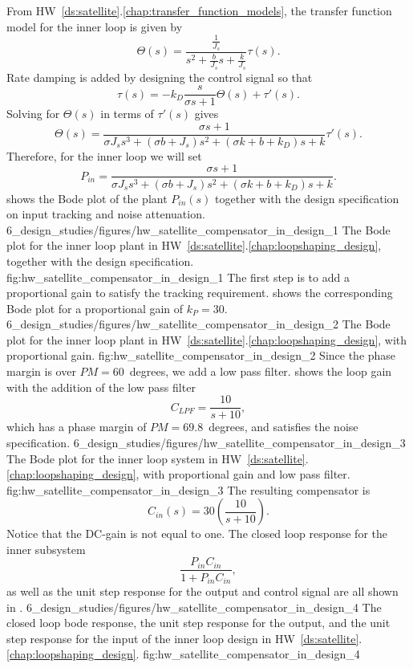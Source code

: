 From HW~\ref{ds:satellite}.\ref{chap:transfer_function_models}, the transfer function model for the inner loop is given by
\[
\Theta(s)  = \frac{\frac{1}{J_s}}{s^2+\frac{b}{J_s}s+\frac{k}{J_s}}\tau(s).
\]
Rate damping is added by designing the control signal so that
\[
\tau(s) = -k_D\frac{s}{\sigma s+1}\Theta(s) + \tau'(s).
\]
Solving for $\Theta(s)$ in terms of $\tau'(s)$ gives
\[
\Theta(s)  = \frac{\sigma s + 1}{\sigma J_s s^3 + (\sigma b + J_s)s^2+(\sigma k + b + k_D)s + k}\tau'(s).
\]
Therefore, for the inner loop we will set
\[
P_{in} = \frac{\sigma s + 1}{\sigma J_s s^3 + (\sigma b + J_s)s^2+(\sigma k + b + k_D)s + k}.
\]
 shows the Bode plot of the plant $P_{in}(s)$ together with the design specification on input tracking and noise attenuation.
%
	{6_design_studies/figures/hw_satellite_compensator_in_design_1}
   	{The Bode plot for the inner loop plant in HW~\ref{ds:satellite}.\ref{chap:loopshaping_design}, together with the design specification.}
   	{fig:hw_satellite_compensator_in_design_1}
The first step is to add a proportional gain to satisfy the tracking requirement.
 shows the corresponding Bode plot for a proportional gain of $k_P=30$.
	{6_design_studies/figures/hw_satellite_compensator_in_design_2}
   	{The Bode plot for the inner loop plant in HW~\ref{ds:satellite}.\ref{chap:loopshaping_design}, with proportional gain.}
   	{fig:hw_satellite_compensator_in_design_2}
Since the phase margin is over $PM=60$~degrees, we add a low pass filter.  
 shows the loop gain with the addition of the low pass filter
\[
C_{LPF} = \frac{10}{s+10},
\]
which has a phase margin of $PM=69.8$~degrees, and satisfies the noise specification.
	{6_design_studies/figures/hw_satellite_compensator_in_design_3}
   	{The Bode plot for the inner loop system in HW~\ref{ds:satellite}.\ref{chap:loopshaping_design}, with proportional gain and low pass filter.}
   	{fig:hw_satellite_compensator_in_design_3}
The resulting compensator is
\[
C_{in}(s) = 30\left(\frac{10}{s+10}\right).
\]
Notice that the DC-gain is not equal to one.
The closed loop response for the inner subsystem
\[
\frac{P_{in}C_{in}}{1+P_{in}C_{in}},
\] 
as well as the unit step response for the output and control signal are all shown in .
	{6_design_studies/figures/hw_satellite_compensator_in_design_4}
   	{The closed loop bode response, the unit step response for the output, and the unit step response for the input of the inner loop design in HW~\ref{ds:satellite}.\ref{chap:loopshaping_design}.}
   	{fig:hw_satellite_compensator_in_design_4}


